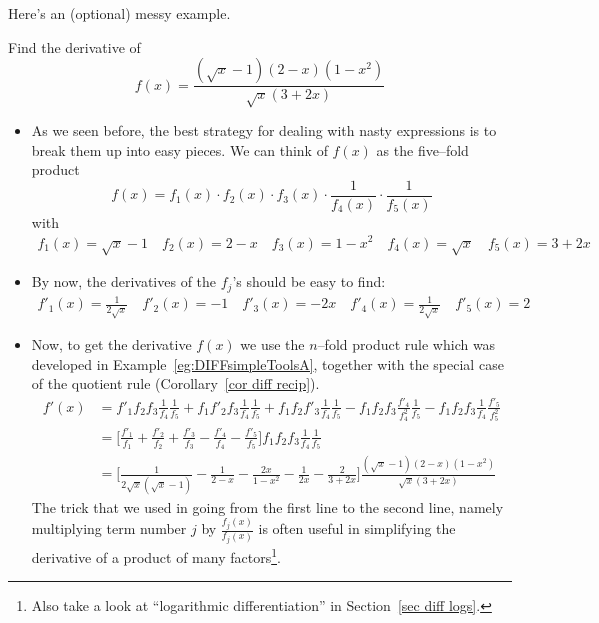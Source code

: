 Here's an (optional) messy example.
\begin{eg}\label{eg:DIFFsimpleToolsNB}
Find the derivative of
\begin{equation*}
f(x)=\frac{(\sqrt{x}-1)(2-x)(1-x^2)}{\sqrt{x}(3+2x)}
\end{equation*}

\begin{itemize}
 \item As we seen before, the best strategy for dealing with nasty
expressions is to break them up into easy pieces. We can think of
$f(x)$ as the five--fold product
\begin{equation*}
f(x)=f_1(x)\cdot f_2(x)\cdot f_3(x)\cdot \frac{1}{f_4(x)}\cdot \frac{1}{f_5(x)}
\end{equation*}
with
\begin{align*}
f_1(x)=\sqrt{x}-1\quad
f_2(x)=2-x\quad
f_3(x)=1-x^2\quad
f_4(x)=\sqrt{x}\quad
f_5(x)=3+2x
\end{align*}
\item By now, the derivatives of the $f_j$'s should be easy to find:
\begin{align*}
f'_1(x)=\frac{1}{2\sqrt{x}}\quad
f'_2(x)=-1\quad
f'_3(x)=-2x\quad
f'_4(x)=\frac{1}{2\sqrt{x}}\quad
f'_5(x)=2
\end{align*}
\item Now, to get the derivative $f(x)$ we use the $n$--fold product rule which was
developed in Example~\ref{eg:DIFFsimpleToolsA}, together with the special case
of the quotient rule (Corollary~\ref{cor diff recip}).
\begin{align*}
f'(x)&=f'_1f_2f_3\frac{1}{f_4}\frac{1}{f_5}
+f_1f'_2f_3\frac{1}{f_4}\frac{1}{f_5}
+f_1f_2f'_3\frac{1}{f_4}\frac{1}{f_5}
-f_1f_2f_3\frac{f'_4}{f^2_4}\frac{1}{f_5}
-f_1f_2f_3\frac{1}{f_4}\frac{f'_5}{f^2_5}\\[0.1in]
&=\Big[\frac{f'_1}{f_1}+\frac{f'_2}{f_2}+\frac{f'_3}{f_3}-\frac{f'_4}{f_4}
-\frac{f'_5}{f_5}\Big]f_1f_2f_3\frac{1}{f_4}\frac{1}{f_5}\\[5mm]
&=\bigg[\frac{1}{2\sqrt{x}(\sqrt{x}-1)}
       -\frac{1}{2-x}-\frac{2x}{1-x^2}-\frac{1}{2x}
-\frac{2}{3+2x}\bigg]\frac{(\sqrt{x}-1)(2-x)(1-x^2)}{\sqrt{x}(3+2x)}
\end{align*}
The trick that we used in going from the first line to the second line,
namely multiplying term number $j$ by $\frac{f_j(x)}{f_j(x)}$
is often useful in simplifying the derivative of a product of many
factors\footnote{Also take a look at ``logarithmic differentiation'' in
Section~\ref{sec diff logs}.}.
\end{itemize}

\end{eg}


